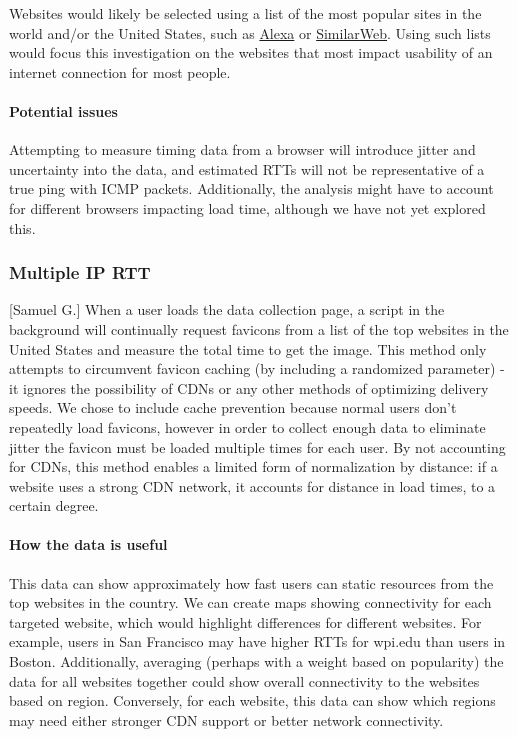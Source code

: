 \documentclass[12pt]{article}
\begin{document}
Websites would likely be selected using a list of the most popular sites in the world and/or the United States, such as \href{www.alexa.com/topsites}{Alexa} or \href{www.similarweb.com/top-websites}{SimilarWeb}. Using such lists would focus this investigation on the websites that most impact usability of an internet connection for most people.

\paragraph{Potential issues}
Attempting to measure timing data from a browser will introduce jitter and uncertainty into the data, and estimated RTTs will not be representative of a true ping with ICMP packets. Additionally, the analysis might have to account for different browsers impacting load time, although we have not yet explored this.

\subsubsection{Multiple IP RTT}[Samuel G.]
When a user loads the data collection page, a script in the background will continually request favicons from a list of the top websites in the United States and measure the total time to get the image. This method only attempts to circumvent favicon caching (by including a randomized parameter) - it ignores the possibility of CDNs or any other methods of optimizing delivery speeds. We chose to include cache prevention because normal users don't repeatedly load favicons, however in order to collect enough data to eliminate jitter the favicon must be loaded multiple times for each user. By not accounting for CDNs, this method enables a limited form of normalization by distance: if a website uses a strong CDN network, it accounts for distance in load times, to a certain degree.

\paragraph{How the data is useful}
This data can show approximately how fast users can static resources from the top websites in the country. We can create maps showing connectivity for each targeted website, which would highlight differences for different websites. For example, users in San Francisco may have higher RTTs for wpi.edu than users in Boston. Additionally, averaging (perhaps with a weight based on popularity) the data for all websites together could show overall connectivity to the websites based on region. Conversely, for each website, this data can show which regions may need either stronger CDN support or better network connectivity.
\end{document}
